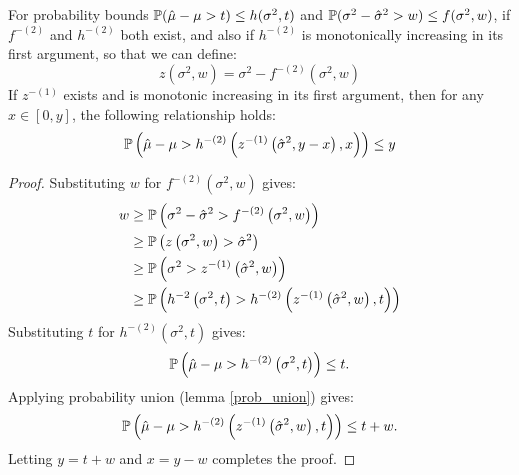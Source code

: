 \begin{theorem}\label{ebb1} 
For probability bounds $\operatorname{\mathbb{P}}(\hat{\mu}-\mu>t)\le h(\sigma^2,t)$ and $\operatorname{\mathbb{P}}(\sigma^2-\hat{\sigma}^2>w)\le f(\sigma^2,w)$,
if $f^{-(2)}$ and $h^{-(2)}$ both exist, and also if $h^{-(2)}$ is monotonically increasing in its first argument, so that we can define:
\[
z(\sigma^2,w) = \sigma^2-f^{-(2)}\left(\sigma^2,w\right)
\]
If $z^{-(1)}$ exists and is monotonic increasing in its first argument, then for any $x\in[0,y]$, the following relationship holds:
\[
\operatorname{\mathbb{P}}\left(\hat{\mu}-\mu>h^{-(2)}\left(z^{-(1)}\left(\hat{\sigma}^2,y-x\right),x\right)\right)
\le y
\]
\end{theorem}
%
\begin{proof}
Substituting $w$ for $f^{-(2)}(\sigma^2,w)$ gives:
\begin{align*}
w & \ge \operatorname{\mathbb{P}}\left(\sigma^2-\hat{\sigma}^2>f^{-(2)}\left(\sigma^2,w\right)\right)\\
 & \ge \operatorname{\mathbb{P}}\left(z\left(\sigma^2,w\right)>\hat{\sigma}^2\right)\\
 & \ge \operatorname{\mathbb{P}}\left(\sigma^2>z^{-(1)}\left(\hat{\sigma}^2,w\right)\right)\\
 & \ge \operatorname{\mathbb{P}}\left(h^{-2}\left(\sigma^2,t\right)>h^{-(2)}\left(z^{-(1)}\left(\hat{\sigma}^2,w\right),t\right)\right)
\end{align*}
Substituting $t$ for $h^{-(2)}(\sigma^2,t)$ gives:
\[
\operatorname{\mathbb{P}}\left(\hat{\mu}-\mu>h^{-(2)}\left(\sigma^2,t\right)\right)
\le t.
\]
Applying probability union (lemma \ref{prob_union}) gives:\\
\[
\operatorname{\mathbb{P}}\left(\hat{\mu}-\mu>h^{-(2)}\left(z^{-(1)}\left(\hat{\sigma}^2,w\right),t\right)\right)
\le t+w.
\]
Letting $y=t+w$ and $x=y-w$ completes the proof.
\end{proof}

